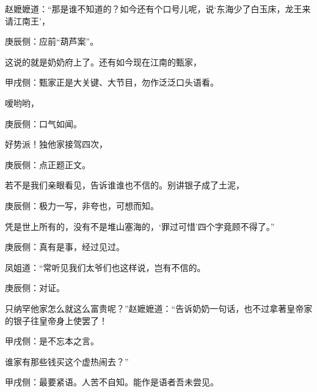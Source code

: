 \begin{parag}
    赵嬷嬷道：“那是谁不知道的？如今还有个口号儿呢，说‘东海少了白玉床，龙王来请江南王’，\begin{note}庚辰侧：应前“葫芦案”。\end{note}这说的就是奶奶府上了。还有如今现在江南的甄家，\begin{note}甲戌侧：甄家正是大关键、大节目，勿作泛泛口头语看。\end{note}嗳哟哟，\begin{note}庚辰侧：口气如闻。\end{note}好势派！独他家接驾四次，\begin{note}庚辰侧：点正题正文。\end{note}若不是我们亲眼看见，告诉谁谁也不信的。别讲银子成了土泥，\begin{note}庚辰侧：极力一写，非夸也，可想而知。\end{note}凭是世上所有的，没有不是堆山塞海的，‘罪过可惜’四个字竟顾不得了。”\begin{note}庚辰侧：真有是事，经过见过。\end{note}凤姐道：“常听见我们太爷们也这样说，岂有不信的。\begin{note}庚辰侧：对证。\end{note}只纳罕他家怎么就这么富贵呢？”赵嬷嬷道：“告诉奶奶一句话，也不过拿著皇帝家的银子往皇帝身上使罢了！\begin{note}甲戌侧：是不忘本之言。\end{note}谁家有那些钱买这个虚热闹去？”\begin{note}甲戌侧：最要紧语。人苦不自知。能作是语者吾未尝见。\end{note}
\end{parag}


